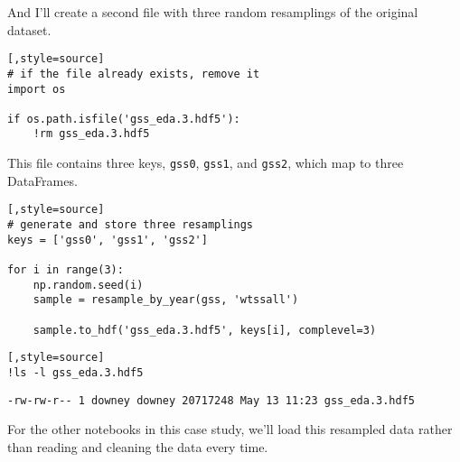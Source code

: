 And I'll create a second file with three random resamplings of the
original dataset.

\begin{lstlisting}[,style=source]
# if the file already exists, remove it
import os

if os.path.isfile('gss_eda.3.hdf5'):
    !rm gss_eda.3.hdf5
\end{lstlisting}

This file contains three keys, \passthrough{\lstinline!gss0!},
\passthrough{\lstinline!gss1!}, and \passthrough{\lstinline!gss2!},
which map to three DataFrames.

\begin{lstlisting}[,style=source]
# generate and store three resamplings
keys = ['gss0', 'gss1', 'gss2']

for i in range(3):
    np.random.seed(i)
    sample = resample_by_year(gss, 'wtssall')

    sample.to_hdf('gss_eda.3.hdf5', keys[i], complevel=3)
\end{lstlisting}

\begin{lstlisting}[,style=source]
!ls -l gss_eda.3.hdf5
\end{lstlisting}

\begin{lstlisting}[style=output]
-rw-rw-r-- 1 downey downey 20717248 May 13 11:23 gss_eda.3.hdf5
\end{lstlisting}

For the other notebooks in this case study, we'll load this resampled
data rather than reading and cleaning the data every time.


